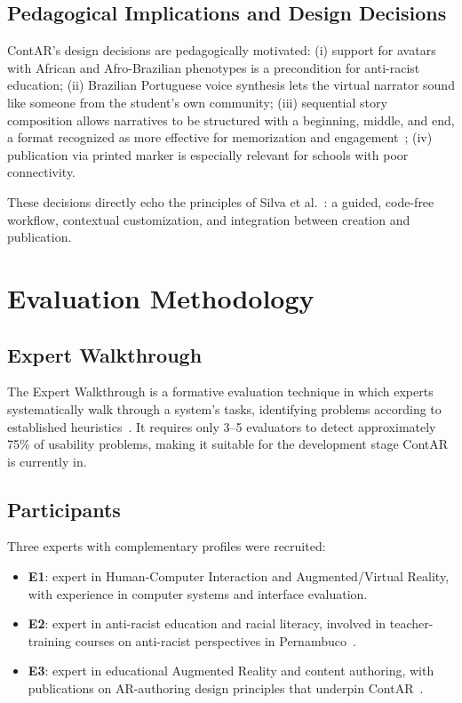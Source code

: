 \documentclass[conference]{IEEEtran}
\begin{document}
\subsection{Pedagogical Implications and Design Decisions}

ContAR's design decisions are pedagogically motivated: (i) support for
avatars with African and Afro-Brazilian phenotypes is a precondition for
anti-racist education; (ii) Brazilian Portuguese voice synthesis lets the
virtual narrator sound like someone from the student's own community;
(iii) sequential story composition allows narratives to be structured with a
beginning, middle, and end, a format recognized as more effective for
memorization and engagement~\cite{fonnet2021}; (iv) publication via printed
marker is especially relevant for schools with poor connectivity.

These decisions directly echo the principles of Silva et
al.~\cite{silva2023}: a guided, code-free workflow, contextual customization,
and integration between creation and publication.

\section{Evaluation Methodology}

\subsection{Expert Walkthrough}

The Expert Walkthrough is a formative evaluation technique in which experts
systematically walk through a system's tasks, identifying problems according
to established heuristics~\cite{nielsen1994}. It requires only 3--5 evaluators
to detect approximately 75\% of usability problems, making it suitable for
the development stage ContAR is currently in.

\subsection{Participants}

Three experts with complementary profiles were recruited:

\begin{itemize}
  \item \textbf{E1}: expert in Human-Computer Interaction and
    Augmented/Virtual Reality, with experience in computer systems and
    interface evaluation.
  \item \textbf{E2}: expert in anti-racist education and racial literacy,
    involved in teacher-training courses on anti-racist perspectives in
    Pernambuco~\cite{araujo2023a}.
  \item \textbf{E3}: expert in educational Augmented Reality and content
    authoring, with publications on AR-authoring design principles that
    underpin ContAR~\cite{silva2022,silva2023}.
\end{itemize}
\end{document}
